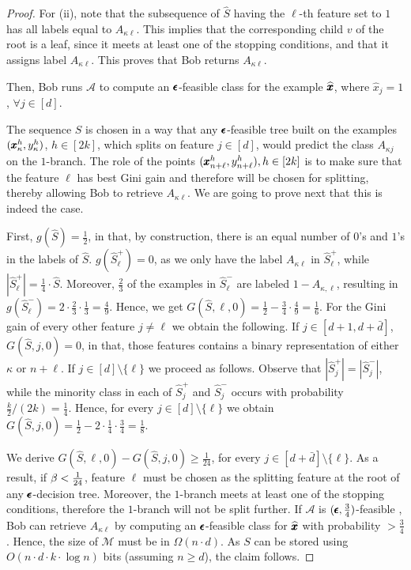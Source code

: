 \begin{proof}
For (ii), note that the subsequence of $\widehat{S}$ having the $\ell$-th feature set to $1$ has all labels equal to $A_{\kappa\ell}$. This implies that the corresponding child $v$ of the root is a leaf, since it meets at least one of the stopping conditions, and that it assigns label $A_{\kappa\ell}$. This proves that Bob returns $A_{\kappa\ell}$.

Then, Bob runs $\mathcal{A}$ to compute an $\pmb{\epsilon}$-feasible class for the example $\widehat{\pmb{x}}$, where $\widehat{x}_j=1$, $\forall j \in [d]$. 

The sequence $S$ is chosen in a way that any $\pmb{\epsilon}$-feasible tree built on the examples $(\pmb{x}_{\kappa}^h,y_{\kappa}^h)$, $h \in [2k]$, which splits on feature $j \in [d]$, would predict the class $A_{\kappa j}$ on the $1$-branch. The role of the points $(\pmb{x}_{n+\ell}^h,y_{n+\ell}^h), h \in [2k]$ is to make sure that the feature $\ell$ has best Gini gain and therefore will be chosen for splitting, thereby allowing Bob to retrieve $A_{\kappa\ell}$. We are going to prove next that this is indeed the case. 

First, $g(\widehat{S})=\frac12$, in that, by construction, there is an equal number of $0$'s and $1$'s in the labels of  $\widehat{S}$.
$g(\widehat{S}_{\ell}^{+})=0$, as we only have the label $A_{\kappa\ell}$ in $\widehat{S}_{\ell}^{+}$, while $|\widehat{S}_{\ell}^{+} | = \frac14 \cdot \widehat{S}$. Moreover, $\frac23$ of the examples in $\widehat{S}_{\ell}^{-}$ are labeled $1-A_{\kappa,\ell}$, resulting in $g(\widehat{S}_{\ell}^{-})= 2 \cdot \frac23 \cdot \frac13 = \frac49$. Hence, we get $G(\widehat{S},\ell,0)= \frac12 - \frac34 \cdot \frac49 = \frac16$. For the Gini gain of every other feature $j \neq \ell$ we obtain the following. If $j \in [d+1,d+\bar{d}]$, $G(\widehat{S},j,0)=0$, in that, those features contains a binary representation of either $\kappa$ or $n+\ell$. If $j \in [d] \setminus \{\ell \}$ we proceed as follows. Observe that $|\widehat{S}_{j}^{+}| = |\widehat{S}_{j}^{-}|$, while the minority class in each of $\widehat{S}_{j}^{+}$ and $\widehat{S}_{j}^{-}$ occurs with probability $\frac{k}{2} / (2k) = \frac14$. Hence, for every $j \in [d] \setminus \{\ell \}$ we obtain $G(\widehat{S},j,0)= \frac12 - 2 \cdot \frac14 \cdot \frac 34 = \frac18 $.

We derive $G(\widehat{S},\ell,0) - G(\widehat{S},j,0) \geq \frac1{24}$, for every $j \in [d+\bar{d}] \setminus \{\ell\}$. As a result, if $\beta < \frac1{24}$, feature $\ell$ must be chosen as the splitting feature at the root of any $\pmb{\epsilon}$-decision tree. Moreover, the $1$-branch meets at least one of the stopping conditions, therefore the $1$-branch will not be split further. If $\mathcal{A}$ is $(\pmb{\epsilon},\frac34)$-feasible , Bob can retrieve $A_{\kappa\ell}$ by computing an $\pmb{\epsilon}$-feasible class for $\widehat{\pmb{x}}$ with probability $> \frac34$. Hence, the size of $\mathcal{M}$ must be in $\Omega(n \cdot d)$. As $S$ can be stored using $O(n \cdot d \cdot k \cdot \log n)$ bits (assuming $n \geq d$), the claim follows. 


\end{proof}
